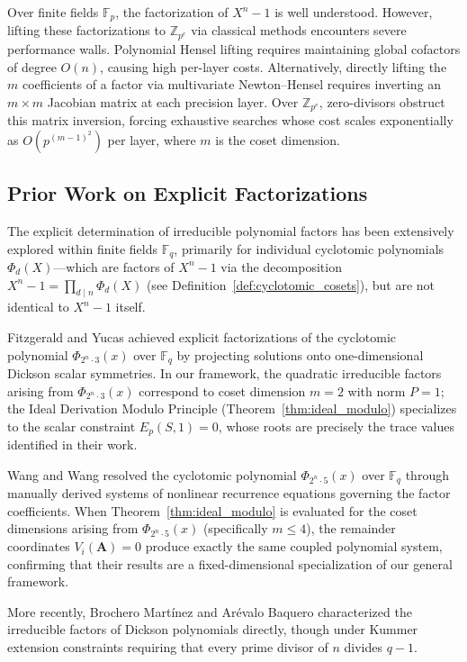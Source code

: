 \documentclass[12pt]{article}
\theoremstyle{plain}
\begin{document}
Over finite fields $\mathbb{F}_p$, the factorization of $X^n-1$ is well understood. However, lifting these factorizations to $\mathbb{Z}_{p^e}$ via classical methods encounters severe performance walls. Polynomial Hensel lifting requires maintaining global cofactors of degree $O(n)$, causing high per-layer costs. Alternatively, directly lifting the $m$ coefficients of a factor via multivariate Newton--Hensel requires inverting an $m \times m$ Jacobian matrix at each precision layer. Over $\mathbb{Z}_{p^e}$, zero-divisors obstruct this matrix inversion, forcing exhaustive searches whose cost scales exponentially as $O(p^{(m-1)^2})$ per layer, where $m$ is the coset dimension.

\subsection{Prior Work on Explicit Factorizations}
The explicit determination of irreducible polynomial factors has been extensively explored within finite fields $\mathbb{F}_q$, primarily for individual cyclotomic polynomials $\Phi_d(X)$---which are factors of $X^n-1$ via the decomposition $X^n - 1 = \prod_{d \mid n} \Phi_d(X)$ (see Definition~\ref{def:cyclotomic_cosets}), but are not identical to $X^n-1$ itself.

Fitzgerald and Yucas \cite{Fitzgerald2007} achieved explicit factorizations of the cyclotomic polynomial $\Phi_{2^n \cdot 3}(x)$ over $\mathbb{F}_q$ by projecting solutions onto one-dimensional Dickson scalar symmetries. In our framework, the quadratic irreducible factors arising from $\Phi_{2^n \cdot 3}(x)$ correspond to coset dimension $m = 2$ with norm $P = 1$; the Ideal Derivation Modulo Principle (Theorem~\ref{thm:ideal_modulo}) specializes to the scalar constraint $E_p(S, 1) = 0$, whose roots are precisely the trace values identified in their work.

Wang and Wang \cite{Wang2012} resolved the cyclotomic polynomial $\Phi_{2^n \cdot 5}(x)$ over $\mathbb{F}_q$ through manually derived systems of nonlinear recurrence equations governing the factor coefficients. When Theorem~\ref{thm:ideal_modulo} is evaluated for the coset dimensions arising from $\Phi_{2^n \cdot 5}(x)$ (specifically $m \leq 4$), the remainder coordinates $V_i(\mathbf{A}) = 0$ produce exactly the same coupled polynomial system, confirming that their results are a fixed-dimensional specialization of our general framework.

More recently, Brochero Mart{\'{i}}nez and Ar{\'{e}}valo Baquero \cite{Brochero2019} characterized the irreducible factors of Dickson polynomials directly, though under Kummer extension constraints requiring that every prime divisor of $n$ divides $q-1$.
\end{document}
